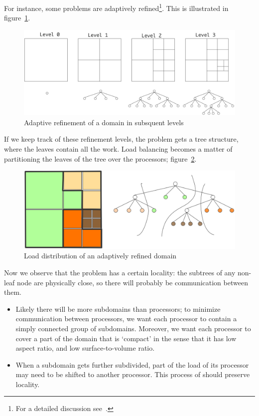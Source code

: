 For instance, some problems are adaptively
refined\footnote{For a detailed
  discussion see~\cite{Campbell:octree}.}. This is illustrated in
figure~\ref{fig:octree1}.
\begin{figure}[ht]
  \includegraphics[scale=.14]{graphics-public/my_octree1}
  \caption{Adaptive refinement of a domain in subsquent levels}
  \label{fig:octree1}
\end{figure}
If we keep track of these refinement levels, the problem gets a tree
structure, where the leaves contain all the work.
Load balancing becomes a matter of partitioning the leaves of the
tree over the processors; figure~\ref{fig:octree2}.
\begin{figure}[ht]
  \includegraphics[scale=.18]{graphics-public/my_octree2}
  \caption{Load distribution of an adaptively refined domain}
  \label{fig:octree2}
\end{figure}
Now we observe that the problem has a certain locality: the subtrees
of any non-leaf node are physically close, so there will probably be
communication between them. 
\begin{itemize}
\item Likely there will be more subdomains than processors; to
  minimize communication between processors, we want each processor to
  contain a simply connected group of subdomains. Moreover, we want
  each processor to cover a part of the domain that is `compact' in
  the sense that it has low aspect ratio, and low surface-to-volume
  ratio.
\item When a subdomain gets further subdivided, part of the load of
  its processor may need to be shifted to another processor. This
  process of  should preserve
  locality.
\end{itemize}

